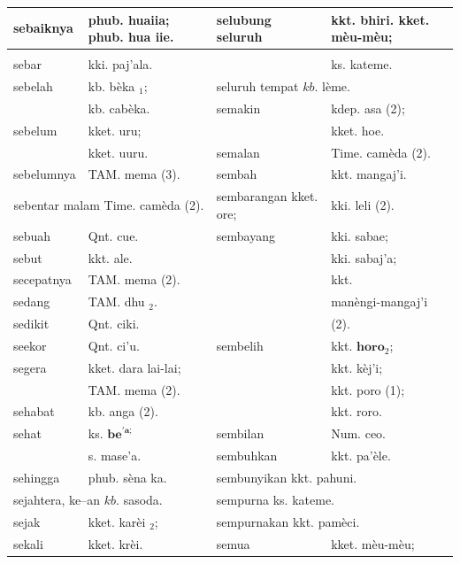 \documentclass[10pt]{article}
\begin{document}
\begin{center}
\begin{tabular}{|l|l|l|l|}
\hline
sebaiknya & phub. huaiia; phub. hua iie. & selubung seluruh & kkt. bhiri. kket. mèu-mèu; \\
\hline
 &  &  &  \\
\hline
sebar & kki. paj'ala. &  & ks. kateme. \\
\hline
sebelah & kb. bèka \({ }_{1}\); & \multicolumn{2}{|l|}{seluruh tempat \(k b\). lème.} \\
\hline
 & kb. cabèka. & semakin & kdep. asa (2); \\
\hline
sebelum & kket. uru; &  & kket. hoe. \\
\hline
 & kket. uuru. & semalan & Time. camèda (2). \\
\hline
sebelumnya & TAM. mema (3). & sembah & kkt. mangaj'i. \\
\hline
\multicolumn{2}{|c|}{sebentar malam Time. camèda (2).} & sembarangan kket. ore; & kki. leli (2). \\
\hline
sebuah & Qnt. cue. & sembayang & kki. sabae; \\
\hline
sebut & kkt. ale. &  & kki. sabaj'a; \\
\hline
secepatnya & TAM. mema (2). &  & kkt. \\
\hline
sedang & TAM. dhu \({ }_{2}\). &  & manèngi-mangaj'i \\
\hline
sedikit & Qnt. ciki. &  & (2). \\
\hline
seekor & Qnt. ci'u. & sembelih & kkt. \(\mathbf{h o r o}_{2}\); \\
\hline
segera & kket. dara lai-lai; &  & kkt. kèj'i; \\
\hline
 & TAM. mema (2). &  & kkt. poro (1); \\
\hline
sehabat & kb. anga (2). &  & kkt. roro. \\
\hline
sehat & ks. \(\mathbf{b e}^{\boldsymbol{\prime} \boldsymbol{a} \text {; }}\) & sembilan & Num. ceo. \\
\hline
 & s. mase'a. & sembuhkan & kkt. pa'èle. \\
\hline
sehingga & phub. sèna ka. & \multicolumn{2}{|l|}{sembunyikan kkt. pahuni.} \\
\hline
\multicolumn{2}{|l|}{sejahtera, ke--an \(k b\). sasoda.} & \multicolumn{2}{|l|}{sempurna ks. kateme.} \\
\hline
sejak & kket. karèi \({ }_{2}\); & \multicolumn{2}{|l|}{sempurnakan kkt. pamèci.} \\
\hline
\multirow{4}{*}{sekali} & kket. krèi. & semua & kket. mèu-mèu; \\

\end{tabular}
\end{center}
\end{document}
